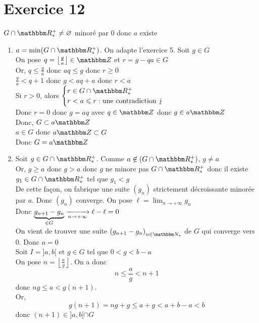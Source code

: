 \part{Exercice 12}

$G \cap  \R_*^+ \neq  \O$ minoré par $0$ donc $a$ existe

\begin{enumerate}
	\item $a = \min(G \cap \R_*^+)$. On adapte l'exercice 5. Soit $g \in G$ \\
		On pose $q = \left\lfloor \frac{g}{a} \right\rfloor \in \Z$ et $r = g - qa \in G$\\
		Or, $q \le \frac{g}{a}$ donc $aq \le g$ donc $r \ge 0$\\
		$\frac{g}{a}< q+1$ donc $g < aq+a$ donc  $r < a$ \\
		Si $r > 0$, alors $\begin{cases}
			r \in G \cap \R_*^+\\
			r < a \le r: \text{une contradiction } \lightning
		\end{cases}$\\
		Donc $r = 0$ donc $g = aq$ avec $q \in \Z$ donc $g \in a\Z$\\
		Donc, $G \subset  a\Z$ \\
		$a \in G$ donc $a\Z \subset G$\\
		Donc $G = a\Z$
	\item
		Soit $g \in G\cap \R_*^+$. Comme $a \not\in \left( G \cap \R_*^+ \right)$, $g \neq a$ \\
		Or, $g \ge  a$ donc $g > a$ donc $g$ ne minore pas $G \cap  \R_*^+$ donc il existe $g_1 \in G \cap \R_*^+$ tel que $g_1 < g$ \\
		De cette façon, on fabrique une suite $(g_n)$ strictement décroissante minorée par $a$.
		Donc $(g_n)$ converge. On pose $\ell = \lim_{n \to +\infty} g_n$ \\
		Donc $\underbrace{g_{n+1}-g_n}_{\in G} \xrightarrow[n \to +\infty]{} \ell - \ell = 0$\\
		On vient de trouver une suite $\left( g_{n+1} - g_n \right)_{n \in \N_*}$ de $G$ qui converge vers $0$. Donc $a = 0$\\
		Soit  $I = ]a,b[$ et $g \in G$ tel que $0 < g < b - a$ \\
		On pose $n = \left\lfloor \frac{a}{g} \right\rfloor$. On a donc \[
			n \le \frac{a}{g} < n+1
		\] donc $ng \le a < g(n+1)$.\\
		Or, \[
			g(n+1) = ng+g \le a+g < a+b-a < b
		\] donc $(n+1) \in ]a,b[\cap G$
\end{enumerate}
